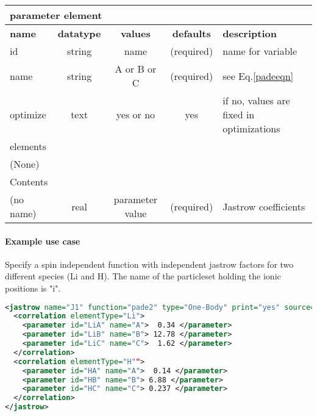 \begin{table}[h]
\begin{center}
\begin{tabular}{l c c c l }
\hline
\multicolumn{5}{l}{parameter element} \\
\hline
\bfseries name & \bfseries datatype & \bfseries values & \bfseries defaults & \bfseries description \\
\hline
id & string & name & (required) & name for variable \\
name & string & A or B or C & (required) & see Eq.\ref{padeeqn}\\
optimize & text & yes or no & yes & if no, values are fixed in optimizations \\
\hline
\multicolumn{5}{l}{elements}\\ \hline
(None) & & & \\ \hline
\multicolumn{5}{l}{Contents}\\ \hline
 (no name) & real & parameter value & (required) & Jastrow coefficients \\ \hline
\end{tabular}
\end{center}
\end{table}

\paragraph{Example use case}
\label{sec:1bjpadeexamples}

Specify a spin independent function with independent jastrow factors for two different species (Li and H).
The name of the particleset holding the ionic positions is "i".
\begin{lstlisting}[language=xml]
<jastrow name="J1" function="pade2" type="One-Body" print="yes" source="i">
  <correlation elementType="Li">
    <parameter id="LiA" name="A">  0.34 </parameter>
    <parameter id="LiB" name="B"> 12.78 </parameter>
    <parameter id="LiC" name="C">  1.62 </parameter>
  </correlation>
  <correlation elementType="H"">
    <parameter id="HA" name="A">  0.14 </parameter>
    <parameter id="HB" name="B"> 6.88 </parameter>
    <parameter id="HC" name="C"> 0.237 </parameter>
  </correlation>
</jastrow>
\end{lstlisting}